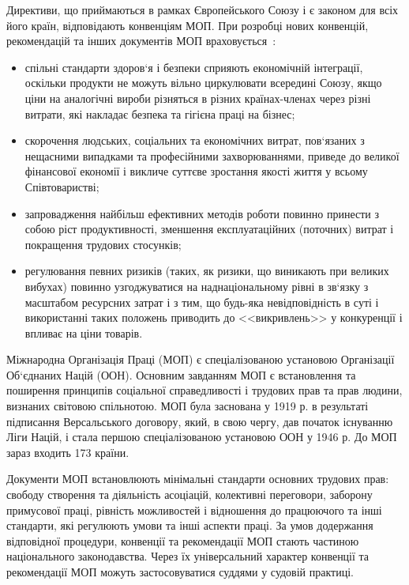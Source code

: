 Директиви, що приймаються в рамках Європейського Союзу і є законом для всіх його країн, відповідають конвенціям МОП. 
При розробці нових конвенцій, рекомендацій та інших документів МОП враховується~\cite{LectureKPI}:
\begin{itemize}
	\item спільні стандарти здоров‘я і безпеки сприяють економічній інтеграції, оскільки продукти не можуть вільно циркулювати всередині Союзу, якщо ціни на аналогічні вироби різняться в різних країнах-членах через різні витрати, які накладає безпека та гігієна праці на бізнес;
	\item скорочення людських, соціальних та економічних витрат, пов‘язаних з нещасними випадками та професійними захворюваннями, приведе до великої фінансової економії і викличе суттєве зростання якості життя у всьому Співтоваристві;
	\item запровадження найбільш ефективних методів роботи повинно принести з собою ріст продуктивності, зменшення експлуатаційних (поточних) витрат і покращення трудових стосунків;
	\item регулювання певних ризиків (таких, як ризики, що виникають при великих вибухах) повинно узгоджуватися на наднаціональному рівні в зв‘язку з масштабом ресурсних затрат і з тим, що будь-яка невідповідність в суті і використанні таких положень приводить до <<викривлень>> у конкуренції і впливає на ціни товарів.	
\end{itemize}

Міжнародна Організація Праці (МОП) є спеціалізованою установою Організації Об`єднаних Націй (ООН). 
Основним завданням МОП є встановлення та поширення принципів соціальної справедливості і трудових прав та прав людини, визнаних світовою спільнотою.
МОП була заснована у 1919 р. в результаті підписання Версальського договору, який, в свою чергу, дав початок існуванню Ліги Націй, і стала першою спеціалізованою установою ООН у 1946 р.
До МОП зараз входить 173 країни. 

Документи МОП встановлюють мінімальні стандарти основних трудових прав: свободу створення та діяльність асоціацій, колективні переговори, заборону примусової праці, рівність можливостей і відношення до працюючого та інші стандарти, які регулюють умови та інші аспекти праці. 
За умов додержання відповідної процедури, конвенції та рекомендації МОП стають частиною національного законодавства. 
Через їх універсальний характер конвенції та рекомендації МОП можуть застосовуватися суддями у судовій практиці.

